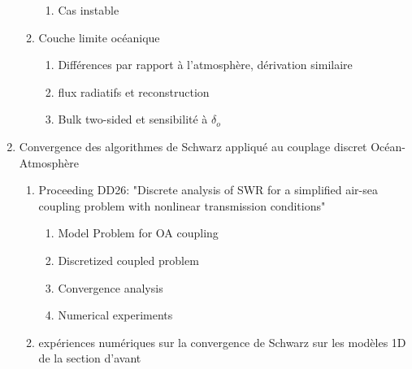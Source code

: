 \documentclass{article}
\begin{document}
\begin{enumerate}
\begin{enumerate}
\begin{enumerate}
				\item Cas instable
			\end{enumerate}
		\item Couche limite océanique
			\begin{enumerate}
				\item Différences par rapport à
					l'atmosphère,
					dérivation similaire
				\item flux radiatifs et reconstruction
				\item Bulk two-sided et sensibilité à
					$\delta_o$
			\end{enumerate}
	\end{enumerate}
\item Convergence des algorithmes de Schwarz appliqué au couplage
	discret Océan-Atmosphère
	\begin{enumerate}
	\item Proceeding DD26: "Discrete analysis of SWR for a
		simplified air-sea coupling problem
		with nonlinear transmission conditions"
		\begin{enumerate}
			\item Model Problem for OA coupling
			\item Discretized coupled problem
			\item Convergence analysis
			\item Numerical experiments
		\end{enumerate}
	\item expériences numériques sur la convergence de Schwarz
		sur les modèles 1D de la section d'avant
	\end{enumerate}
\end{enumerate}
\end{document}
